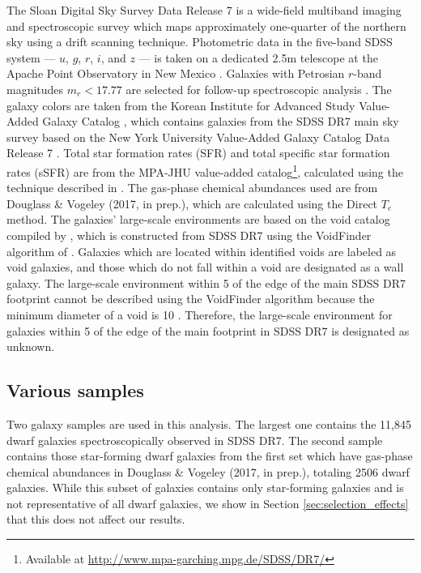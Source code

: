 The Sloan Digital Sky Survey Data Release 7 \citep[SDSS DR7;][]{Abazajian09} is 
a wide-field multiband imaging and spectroscopic survey which maps approximately 
one-quarter of the northern sky using a drift scanning technique.  Photometric 
data in the five-band SDSS system --- $u$, $g$, $r$, $i$, and $z$ --- is taken 
on a dedicated 2.5m telescope at the Apache Point Observatory in New Mexico 
\citep{Fukugita96,Gunn98}.  Galaxies with Petrosian $r$-band magnitudes 
$m_r < 17.77$ are selected for follow-up spectroscopic analysis \citep{Lupton01,
Strauss02}.  The galaxy colors are taken from the Korean Institute for Advanced 
Study Value-Added Galaxy Catalog \citep[KIAS-VAGC;][]{Choi10}, which contains 
galaxies from the SDSS DR7 main sky survey based on the New York University 
Value-Added Galaxy Catalog Data Release 7 \citep[NYU-VAGC;][]{Blanton05}.  Total 
star formation rates (SFR) and total specific star formation rates (sSFR) are 
from the MPA-JHU value-added catalog\footnote{Available at 
\url{http://www.mpa-garching.mpg.de/SDSS/DR7/}}, calculated using the technique 
described in \cite{Brinchmann04}.  The gas-phase chemical abundances used are 
from Douglass \& Vogeley (2017, in prep.), which are calculated using the Direct 
$T_e$ method.  The galaxies' large-scale environments are based on the void 
catalog compiled by \cite{Pan12}, which is constructed from SDSS DR7 using the 
VoidFinder algorithm of \cite{Hoyle02}.  Galaxies which are located within 
identified voids are labeled as void galaxies, and those which do not fall 
within a void are designated as a wall galaxy.  The large-scale environment 
within 5 \hMpc of the edge of the main SDSS DR7 footprint cannot be described 
using the VoidFinder algorithm because the minimum diameter of a void is 10 
\hMpc.  Therefore, the large-scale environment for galaxies within 5 \hMpc of 
the edge of the main footprint in SDSS DR7 is designated as unknown.



\subsection{Various samples}


Two galaxy samples are used in this analysis.  The largest one contains the 
11,845 dwarf galaxies spectroscopically observed in SDSS DR7.  The second sample 
contains those star-forming dwarf galaxies from the first set which have 
gas-phase chemical abundances in Douglass \& Vogeley (2017, in prep.), totaling 
2506 dwarf galaxies.  While this subset of galaxies contains only star-forming 
galaxies and is not representative of all dwarf galaxies, we show in Section 
\ref{sec:selection_effects} that this does not affect our results.


